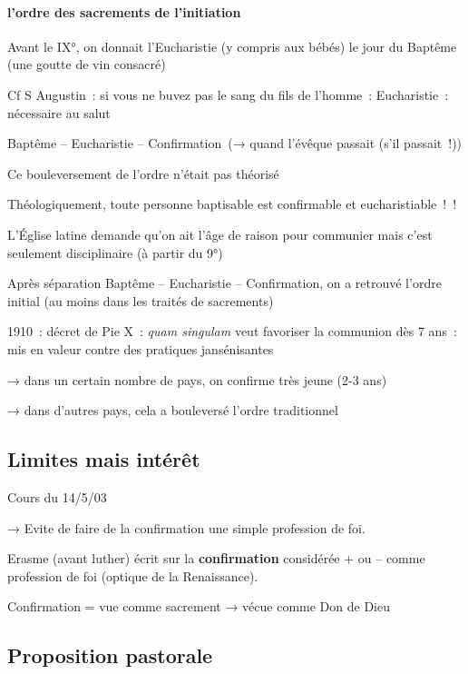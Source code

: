 \hypertarget{a-lordre-des-sacrements-de-linitiation}{%
\paragraph{l'ordre des sacrements de
l'initiation}\label{a-lordre-des-sacrements-de-linitiation}}

Avant le IX°, on donnait l'Eucharistie (y compris aux bébés) le jour du
Baptême (une goutte de vin consacré)

Cf S Augustin~: si vous ne buvez pas le sang du fils de l'homme~:
Eucharistie~: nécessaire au salut

Baptême -- Eucharistie -- Confirmation~(→ quand l'évêque passait (s'il
passait~!))

Ce bouleversement de l'ordre n'était pas théorisé

Théologiquement, toute personne baptisable est confirmable et
eucharistiable~!~!

L'Église latine demande qu'on ait l'âge de raison pour communier mais
c'est seulement disciplinaire (à partir du 9°)

Après séparation Baptême -- Eucharistie -- Confirmation, on a retrouvé
l'ordre initial (au moins dans les traités de sacrements)

1910~: décret de Pie X~: \emph{quam singulam} veut favoriser la
communion dès 7 ans~: mis en valeur contre des pratiques jansénisantes

→ dans un certain nombre de pays, on confirme très jeune (2-3 ans)

→ dans d'autres pays, cela a bouleversé l'ordre traditionnel

\hypertarget{limites-mais-intuxe9ruxeat}{%
\subsection{Limites mais intérêt}\label{limites-mais-intuxe9ruxeat}}

Cours du 14/5/03

→ Evite de faire de la confirmation une simple profession de foi.

Erasme (avant luther) écrit sur la \textbf{confirmation} considérée + ou
-- comme profession de foi (optique de la Renaissance).

Confirmation = vue comme sacrement → vécue comme Don de Dieu

\hypertarget{proposition-pastorale}{%
\subsection{Proposition pastorale}\label{proposition-pastorale}}

